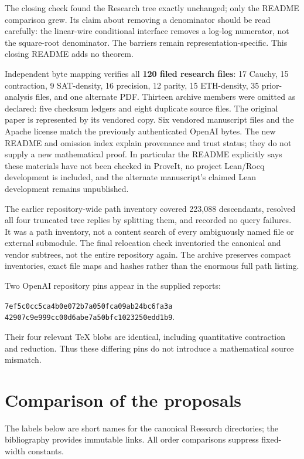 \documentclass[11pt,letterpaper]{article}
\begin{document}
The closing check found the Research tree exactly unchanged; only the README comparison grew. Its claim about removing a denominator should be read carefully: the linear-wire conditional interface removes a log-log numerator, not the square-root denominator. The barriers remain representation-specific. This closing README adds no theorem.

Independent byte mapping verifies all \textbf{120 filed research files}: 17 Cauchy,
15 contraction, 9 SAT-density, 16 precision, 12 parity, 15 ETH-density,
35 prior-analysis files, and one alternate PDF. Thirteen archive members were omitted
as declared: five checksum ledgers and eight duplicate source files.
The original paper is represented by its vendored copy. Six vendored manuscript files
and the Apache license match the previously authenticated OpenAI bytes.
The new README and omission index explain provenance and trust status; they do not
supply a new mathematical proof. In particular the README explicitly says these materials
have not been checked in ProveIt, no project Lean/Rocq development is included, and the
alternate manuscript's claimed Lean development remains unpublished.

The earlier repository-wide path inventory covered 223,088 descendants, resolved all four
truncated tree replies by splitting them, and recorded no query failures. It was a path inventory,
not a content search of every ambiguously named file or external submodule. The final relocation
check inventoried the canonical and vendor subtrees, not the entire repository again.
The archive preserves compact inventories, exact file maps and hashes rather than the enormous
full path listing.

Two OpenAI repository pins appear in the supplied reports:
\begin{center}\small\texttt{7ef5c0cc5ca4b0e072b7a050fca09ab24bc6fa3a}\\
\texttt{42907c9e999cc00d6abe7a50bfc1023250edd1b9}.\end{center}
Their four relevant TeX blobs are identical, including quantitative contraction and reduction.
Thus these differing pins do not introduce a mathematical source mismatch.

\section{Comparison of the proposals}
\label{sec:comparison}
The labels below are short names for the canonical Research directories; the bibliography
provides immutable links. All order comparisons suppress fixed-width constants.
\end{document}

